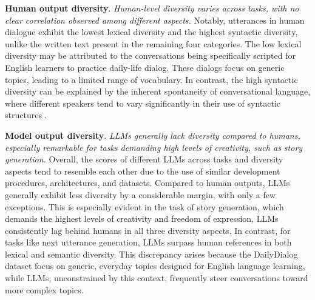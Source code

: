 \documentclass[11pt,a4paper]{article}
\begin{document}
\smallskip
\noindent\textbf{Human output diversity}.
\textit{Human-level diversity varies across tasks, with no clear correlation observed among different aspects.}
Notably, utterances in human dialogue exhibit the lowest lexical diversity and the highest syntactic diversity, unlike the written text present in the remaining four categories.	
The low lexical diversity may be attributed to the conversations being specifically scripted for English learners to practice daily-life dialog. These dialogs focus on generic topics, leading to a limited range of vocabulary. In contrast, the high syntactic diversity can be explained by the inherent spontaneity of conversational language, where different speakers tend to vary significantly in their use of syntactic structures \citep{healey2014divergence, dubuisson-duplessis-etal-2017-automatic}.

\smallskip
\noindent\textbf{Model output diversity}.
\textit{LLMs generally lack diversity compared to humans, especially remarkable for tasks demanding high levels of creativity, such as story generation.}
Overall, the scores of different LLMs across tasks and diversity aspects tend to resemble each other due to the use of similar development procedures, architectures, and datasets.
Compared to human outputs, LLMs generally exhibit less diversity by a considerable margin, with only a few exceptions. This is especially evident in the task of story generation, which demands the highest levels of creativity and freedom of expression, LLMs consistently lag behind humans in all three diversity aspects. In contrast, for tasks like next utterance generation, LLMs surpass human references in both lexical and semantic diversity. This discrepancy arises because the DailyDialog dataset focus on generic, everyday topics designed for English language learning, while LLMs, unconstrained by this context, frequently steer conversations toward more complex topics.
\end{document}
